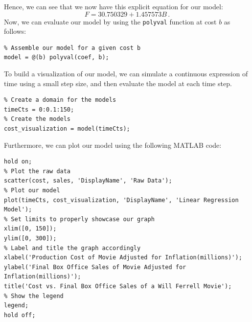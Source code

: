 \documentclass[11pt]{article}
\begin{document}
Hence, we can see that we now have this explicit equation for our model:
\[ F = 30.750329 + 1.457573 B \, .\]
Now, we can evaluate our model by using the \texttt{polyval} function at cost $b$ as follows:
\label{assemble-model-polyval}
\begin{lstlisting}
% Assemble our model for a given cost b
model = @(b) polyval(coef, b);
\end{lstlisting}
To build a visualization of our model, we can simulate a continuous expression of time using a small step size, and then evaluate the model at each time step.
\label{create-visualization}
\begin{lstlisting}
% Create a domain for the models
timeCts = 0:0.1:150;
% Create the models
cost_visualization = model(timeCts);
\end{lstlisting}
Furthermore, we can plot our model using the following MATLAB code:
\label{model-plotting}
\begin{lstlisting}
hold on;
% Plot the raw data
scatter(cost, sales, 'DisplayName', 'Raw Data');
% Plot our model
plot(timeCts, cost_visualization, 'DisplayName', 'Linear Regression Model');
% Set limits to properly showcase our graph
xlim([0, 150]);
ylim([0, 300]);
% Label and title the graph accordingly
xlabel('Production Cost of Movie Adjusted for Inflation(millions)');
ylabel('Final Box Office Sales of Movie Adjusted for Inflation(millions)');
title('Cost vs. Final Box Office Sales of a Will Ferrell Movie');
% Show the legend
legend;
hold off;
\end{lstlisting}
\end{document}
